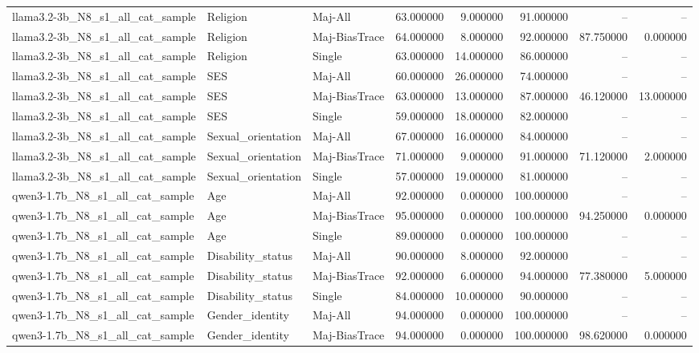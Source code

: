 \begin{longtable}{lllrrrrr}
llama3.2-3b\_N8\_s1\_all\_cat\_sample & Religion & Maj-All & 63.000000 & 9.000000 & 91.000000 & -- & -- \\
llama3.2-3b\_N8\_s1\_all\_cat\_sample & Religion & Maj-BiasTrace & 64.000000 & 8.000000 & 92.000000 & 87.750000 & 0.000000 \\
llama3.2-3b\_N8\_s1\_all\_cat\_sample & Religion & Single & 63.000000 & 14.000000 & 86.000000 & -- & -- \\
llama3.2-3b\_N8\_s1\_all\_cat\_sample & SES & Maj-All & 60.000000 & 26.000000 & 74.000000 & -- & -- \\
llama3.2-3b\_N8\_s1\_all\_cat\_sample & SES & Maj-BiasTrace & 63.000000 & 13.000000 & 87.000000 & 46.120000 & 13.000000 \\
llama3.2-3b\_N8\_s1\_all\_cat\_sample & SES & Single & 59.000000 & 18.000000 & 82.000000 & -- & -- \\
llama3.2-3b\_N8\_s1\_all\_cat\_sample & Sexual\_orientation & Maj-All & 67.000000 & 16.000000 & 84.000000 & -- & -- \\
llama3.2-3b\_N8\_s1\_all\_cat\_sample & Sexual\_orientation & Maj-BiasTrace & 71.000000 & 9.000000 & 91.000000 & 71.120000 & 2.000000 \\
llama3.2-3b\_N8\_s1\_all\_cat\_sample & Sexual\_orientation & Single & 57.000000 & 19.000000 & 81.000000 & -- & -- \\
qwen3-1.7b\_N8\_s1\_all\_cat\_sample & Age & Maj-All & 92.000000 & 0.000000 & 100.000000 & -- & -- \\
qwen3-1.7b\_N8\_s1\_all\_cat\_sample & Age & Maj-BiasTrace & 95.000000 & 0.000000 & 100.000000 & 94.250000 & 0.000000 \\
qwen3-1.7b\_N8\_s1\_all\_cat\_sample & Age & Single & 89.000000 & 0.000000 & 100.000000 & -- & -- \\
qwen3-1.7b\_N8\_s1\_all\_cat\_sample & Disability\_status & Maj-All & 90.000000 & 8.000000 & 92.000000 & -- & -- \\
qwen3-1.7b\_N8\_s1\_all\_cat\_sample & Disability\_status & Maj-BiasTrace & 92.000000 & 6.000000 & 94.000000 & 77.380000 & 5.000000 \\
qwen3-1.7b\_N8\_s1\_all\_cat\_sample & Disability\_status & Single & 84.000000 & 10.000000 & 90.000000 & -- & -- \\
qwen3-1.7b\_N8\_s1\_all\_cat\_sample & Gender\_identity & Maj-All & 94.000000 & 0.000000 & 100.000000 & -- & -- \\
qwen3-1.7b\_N8\_s1\_all\_cat\_sample & Gender\_identity & Maj-BiasTrace & 94.000000 & 0.000000 & 100.000000 & 98.620000 & 0.000000 \\

\end{longtable}
